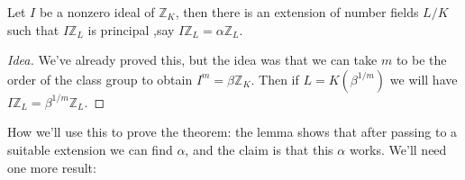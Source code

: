 \begin{lemma}[?]

Let \(I\) be a nonzero ideal of \({\mathbb{Z}}_K\), then there is an
extension of number fields \(L/K\) such that \(I {\mathbb{Z}}_L\) is
principal ,say \(I {\mathbb{Z}}_L = \alpha{\mathbb{Z}}_L\).

\end{lemma}

\begin{proof}[Idea]

We've already proved this, but the idea was that we can take \(m\) to be
the order of the class group to obtain \(I^m = \beta {\mathbb{Z}}_K\).
Then if \(L = K( \beta^{1/m} )\) we will have
\(I{\mathbb{Z}}_L = \beta^{1/m} {\mathbb{Z}}_L\).

\end{proof}

\begin{remark}

How we'll use this to prove the theorem: the lemma shows that after
passing to a suitable extension we can find \(\alpha\), and the claim is
that this \(\alpha\) works. We'll need one more result:

\end{remark}

